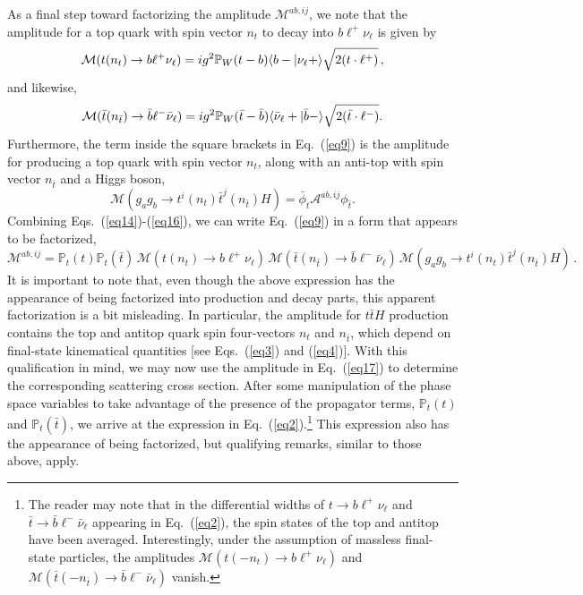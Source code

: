 \documentclass[aps,preprint,tightenlines,floatfix,superscriptaddress,nofootinbib,showpacs]{revtex4-1}
\def\beq{\begin{equation}}
\def\eeq{\end{equation}}
\def\tbar{\bar{t}}
\begin{document}
As a final step toward factorizing the amplitude $\mathcal{M}^{ab,ij}$,
we note that the amplitude for a top quark with spin vector
$n_t$ to decay into $b{\ell}^+\nu_{\ell}$ is given by
%
\beq
\label{eq14}
\mathcal{M}(t(n_t)\to b{\ell}^+\nu_{\ell})=ig^2\mathbb{P}_W(t-b)\langle b-|\nu_{\ell}+\rangle\sqrt{\strut2(t\cdot {\ell}^+)} \,,
\eeq
%
and likewise,
%
\beq
\label{eq15}
\mathcal{M}(\tbar(n_{\tbar})\to \bar{b}{\ell}^-\bar{\nu}_{\ell})=ig^2\mathbb{P}_W(\tbar-\bar{b})\langle \bar{\nu}_{\ell}+|\bar{b}-\rangle\sqrt{\strut2(\tbar\cdot {\ell}^-)}.
\eeq
%
Furthermore, the term inside the square brackets in
Eq.~(\ref{eq9}) is the amplitude for producing a top quark
with spin vector $n_t$, along with an anti-top with spin vector
$n_{\tbar}$ and a Higgs boson,
%
\beq
\label{eq16}
\mathcal{M}(g_ag_b \to t^i(n_t)\tbar^j(n_{\tbar})H)=\bar{\phi}_t \mathcal{A}^{ab,ij}\phi_{\tbar}.
\eeq
%
Combining Eqs.~(\ref{eq14})-(\ref{eq16}), we can write Eq.~(\ref{eq9})
in a form that appears to be factorized,
%
\beq
\label{eq17}
\mathcal{M}^{ab,ij}=\mathbb{P}_t(t)\mathbb{P}_t(\tbar)\,\mathcal{M}(t(n_t)\to b{\ell}^+\nu_{\ell})\,\mathcal{M}(\tbar(n_{\tbar})\to \bar{b}{\ell}^-\bar{\nu}_{\ell})\,\mathcal{M}(g_ag_b \to t^i(n_t)\tbar^j(n_{\tbar})H) \,.
\eeq
%
It is important
to note that, even though the above expression has the appearance of being
factorized into production and decay parts, this apparent
factorization is a bit misleading.  In particular, the amplitude for
$t\tbar H$ production contains the top and antitop quark
spin four-vectors $n_t$ and $n_{\tbar}$, which
depend on final-state kinematical quantities [see
Eqs.~(\ref{eq3}) and (\ref{eq4})].
With this qualification in mind, we may now use the
amplitude in Eq.~(\ref{eq17})
to determine the corresponding scattering cross section.
After some manipulation of the phase space variables
to take advantage of the presence of the
propagator terms, $\mathbb{P}_t(t)$ and $\mathbb{P}_t(\tbar)$,
we arrive at the expression in Eq.~(\ref{eq2}).\footnote{The reader may note that in the differential widths of $t\to b{\ell}^+\nu_{\ell}$ and $\tbar\to \bar{b}{\ell}^-\bar{\nu}_{\ell}$ appearing in 
Eq.~(\ref{eq2}), the spin states of the top and antitop have been averaged. Interestingly, under the assumption of massless final-state particles, the amplitudes $\mathcal{M}(t(-n_t)\to b{\ell}^+\nu_{\ell})$ and $\mathcal{M}(\tbar(-n_{\tbar})\to \bar{b}{\ell}^-\bar{\nu}_{\ell})$ vanish. } This expression
also has the appearance of being factorized, but
qualifying remarks, similar to those above, apply.

\setlength{\abovedisplayskip}{10.2pt}
\setlength{\belowdisplayskip}{10.2pt}
\end{document}
